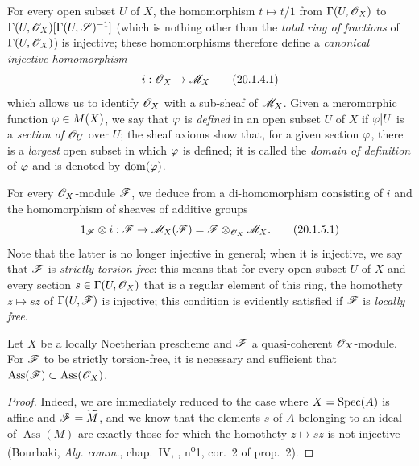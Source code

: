 \begin{env}[20.1.4]\label{IV.20.1.4}
For every open subset $U$ of $X$, the homomorphism $t\mapsto t/1$ from $\Gamma(U,\mathscr{O}_X)$ to $\Gamma(U,\mathscr{O}_X)[\Gamma(U,\mathscr{S})^{-1}]$ (which is nothing other than the \emph{total ring of fractions} of
$\Gamma(U,\mathscr{O}_X)$) is injective; these homomorphisms therefore define a \emph{canonical injective homomorphism}
\[
\label{IV.20.1.4.1}
  i:\mathscr{O}_X\to\mathscr{M}_X
  \tag{20.1.4.1}
\]
which allows us to identify $\mathscr{O}_X$ with a sub-sheaf of $\mathscr{M}_X$.
Given a meromorphic function $\varphi\in M(X)$, we say that $\varphi$ is \emph{defined} in an open subset $U$ of $X$ if $\varphi|U$ is a \emph{section of $\mathscr{O}_U$} over $U$; the sheaf axioms show that, for a given section $\varphi$, there is a \emph{largest} open subset in which $\varphi$ is defined; it is called the \emph{domain of definition} of $\varphi$ and is denoted by $\operatorname{dom}(\varphi)$.
\end{env}

\begin{env}[20.1.5]\label{IV.20.1.5}
For every $\mathscr{O}_X$-module $\mathscr{F}$, we deduce from  a di-homomorphism consisting of $i$ and the homomorphism of sheaves of additive groups
\[
\label{IV.20.1.5.1}
  1_{\mathscr{F}}\otimes i:\mathscr{F}\to\mathscr{M}_X(\mathscr{F})=\mathscr{F}\otimes_{\mathscr{O}_X}\mathscr{M}_X.
  \tag{20.1.5.1}
\]
Note that the latter is no longer injective in general; when it is injective, we say that $\mathscr{F}$ is \emph{strictly torsion-free}: this means that for every open subset $U$ of $X$ and every section $s\in\Gamma(U,\mathscr{O}_X)$ that is a regular element of this ring, the homothety $z\mapsto sz$ of $\Gamma(U,\mathscr{F})$ is injective; this condition is evidently satisfied if $\mathscr{F}$ is \emph{locally free}.
\end{env}

\begin{proposition}[20.1.6]
\label{IV.20.1.6}
Let $X$ be a locally Noetherian prescheme and $\mathscr{F}$ a quasi-coherent $\mathscr{O}_X$-module.
For $\mathscr{F}$ to be strictly torsion-free, it is necessary and sufficient that $\operatorname{Ass}(\mathscr{F})\subset\operatorname{Ass}(\mathscr{O}_X)$.
\end{proposition}

\begin{proof}
Indeed, we are immediately reduced to the case where $X=\operatorname{Spec}(A)$ is affine and $\mathscr{F}=\widetilde M$, and we know that the elements $s$ of $A$ belonging to an ideal of $\operatorname{Ass}(M)$ are exactly those for which the homothety $z\mapsto sz$ is not injective (Bourbaki, \emph{Alg. comm.}, chap.~IV, , n\textsuperscript{o}1, cor.~2 of prop.~2).
\end{proof}

